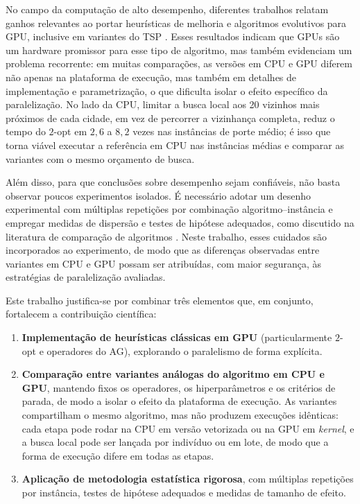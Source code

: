 No campo da computação de alto desempenho, diferentes trabalhos relatam ganhos relevantes ao portar heurísticas de melhoria e algoritmos evolutivos para GPU, inclusive em variantes do TSP \autocite{schulz2013gpu,tsp_gpu,fujimoto2011highly}.
Esses resultados indicam que GPUs são um hardware promissor para esse tipo de algoritmo, mas também evidenciam um problema recorrente: em muitas comparações, as versões em CPU e GPU diferem não apenas na plataforma de execução, mas também em detalhes de implementação e parametrização, o que dificulta isolar o efeito específico da paralelização.
No lado da CPU, limitar a busca local aos 20 vizinhos mais próximos de cada cidade, em vez de percorrer a vizinhança completa, reduz o tempo do \(2\)-opt em \(2{,}6\) a \(8{,}2\) vezes nas instâncias de porte médio; é isso que torna viável executar a referência em CPU nas instâncias médias e comparar as variantes com o mesmo orçamento de busca.

Além disso, para que conclusões sobre desempenho sejam confiáveis, não basta observar poucos experimentos isolados.
É necessário adotar um desenho experimental com múltiplas repetições por combinação algoritmo--instância e empregar medidas de dispersão e testes de hipótese adequados, como discutido na literatura de comparação de algoritmos \autocite{demsar2006statistical}.
Neste trabalho, esses cuidados são incorporados ao experimento, de modo que as diferenças observadas entre variantes em CPU e GPU possam ser atribuídas, com maior segurança, às estratégias de paralelização avaliadas.

Este trabalho justifica-se por combinar três elementos que, em conjunto, fortalecem a contribuição científica:

\begin{enumerate}
      \def\labelenumi{\arabic{enumi}.}
      \tightlist
      \item
            \textbf{Implementação de heurísticas clássicas em GPU} (particularmente \(2\)-opt e operadores do AG), explorando o paralelismo de forma explícita.
      \item
            \textbf{Comparação entre variantes análogas do algoritmo em CPU e GPU}, mantendo fixos os operadores, os hiperparâmetros e os critérios de parada, de modo a isolar o efeito da plataforma de execução.
            As variantes compartilham o mesmo algoritmo, mas não produzem execuções idênticas: cada etapa pode rodar na CPU em versão vetorizada ou na GPU em \emph{kernel}, e a busca local pode ser lançada por indivíduo ou em lote, de modo que a forma de execução difere em todas as etapas.
      \item
            \textbf{Aplicação de metodologia estatística rigorosa}, com múltiplas repetições por instância, testes de hipótese adequados e medidas de tamanho de efeito.
\end{enumerate}

